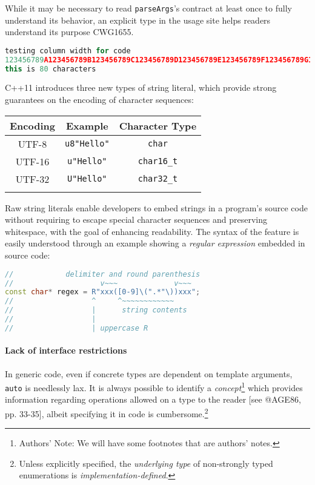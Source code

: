 \documentclass[twoside,10pt,letterpaper,usenames]{newstyle-PearsonGeneric-7-38}
\newcommand{\authorsnote}{Authors' Note: }
\let\Begin\begin
\let\End\end
\begin{document}
While it may be necessary to read \texttt{parseArgs}'s contract at least
once to fully understand its behavior, an explicit type in the usage
site helps readers understand its purpose CWG1655.

\begin{lstlisting}[language=C++]
testing column width for code
123456789A123456789B123456789C123456789D123456789E123456789F123456789G123456789H
this is 80 characters
\end{lstlisting}
    

C++11 introduces three new types of string literal, which provide strong
guarantees on the encoding of character sequences:

\Begin{center}
\Begin{tabular}{c|c|c}
\thickhline

\textbf{Encoding} & \textbf{Example} & \textbf{Character Type} \\ \hline
UTF-8 & \texttt{u8"Hello"} & \texttt{char} \\ \hline UTF-16 &
\texttt{u"Hello"} & \texttt{char16\_t} \\ \hline UTF-32 &
\texttt{U"Hello"} & \texttt{char32\_t} \\

\thickhline
\End{tabular}
\End{center}

Raw string literals enable developers to embed strings in a program's
source code without requiring to escape special character sequences and
preserving whitespace, with the goal of enhancing readability. The
syntax of the feature is easily understood through an example showing a
\emph{regular expression} embedded in source code:

\begin{lstlisting}[language=C++]
//            delimiter and round parenthesis
//                    v~~~             v~~~
const char* regex = R"xxx([0-9]\(".*"\))xxx";
//                  ^     ^~~~~~~~~~~~~
//                  |      string contents
//                  |
//                  | uppercase R
\end{lstlisting}
    

\paragraph[Lack of interface restrictions]{Lack of interface restrictions}\label{lack-of-interface-restrictions}

In generic code, even if concrete types are dependent on template
arguments, \texttt{auto} is needlessly lax. It is always possible to
identify a \emph{concept}{\cprotect\footnote{\authorsnote We will have
  some footnotes that are authors' notes.}} which provides information
regarding operations allowed on a type to the reader {[}see @AGE86, pp.
33-35{]}, albeit specifying it in code is
cumbersome.{\cprotect\footnote{Unless explicitly specified, the
  \emph{underlying type} of non-strongly typed enumerations is
  \emph{implementation-defined}.}}
\end{document}

